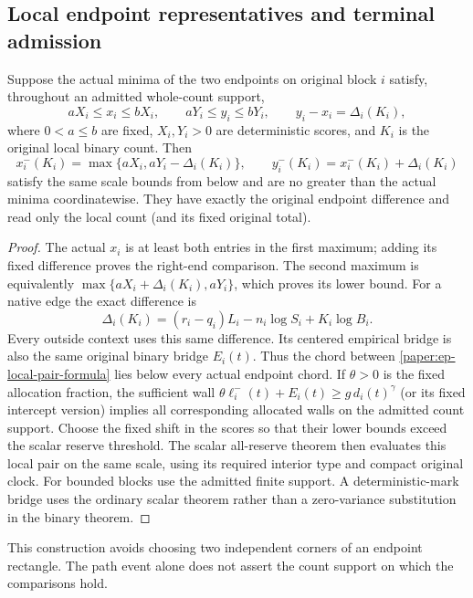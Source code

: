 \subsection{Local endpoint representatives and terminal admission}
\label{paper:ep-localization}
\begin{lemma}
\label{paper:ep-local-pair}
Suppose the actual minima of the two endpoints on original block $i$
satisfy, throughout an admitted whole-count support,
\[
 aX_i\leq x_i\leq bX_i,\qquad aY_i\leq y_i\leq bY_i,
 \qquad y_i-x_i=\Delta_i(K_i),
\]
where $0<a\leq b$ are fixed, $X_i,Y_i>0$ are deterministic scores,
and $K_i$ is the original local binary count.  Then
\begin{equation}\label{paper:ep-local-pair-formula}
 x_i^-(K_i)=\max\{aX_i,aY_i-\Delta_i(K_i)\},\qquad
 y_i^-(K_i)=x_i^-(K_i)+\Delta_i(K_i)
\end{equation}
satisfy the same scale bounds from below and are no greater than the
actual minima coordinatewise.  They have exactly the original endpoint
difference and read only the local count (and its fixed original total).
\end{lemma}
\begin{proof}
The actual $x_i$ is at least both entries in the first maximum;
adding its fixed difference proves the right-end comparison.  The
second maximum is equivalently
$\max\{aX_i+\Delta_i(K_i),aY_i\}$, which proves its lower bound.
For a native edge the exact difference is
\[
 \Delta_i(K_i)=(r_i-q_i)L_i-n_i\log S_i+K_i\log B_i.
\]
Every outside context uses this same difference.  Its centered
empirical bridge is also the same original binary bridge $E_i(t)$.
Thus the chord between \eqref{paper:ep-local-pair-formula} lies below
every actual endpoint chord.  If $\theta>0$ is the fixed allocation
fraction, the sufficient wall
$\theta\ell_i^-(t)+E_i(t)\geq g\,d_i(t)^\gamma$ (or its fixed
intercept version) implies all corresponding allocated walls on the
admitted count support.
Choose the fixed shift in the scores so that their lower bounds
exceed the scalar reserve threshold.  The scalar all-reserve theorem
then evaluates this local pair on the same scale, using its required
interior type and compact original clock.  For bounded blocks use
the admitted finite support.  A deterministic-mark bridge uses the
ordinary scalar theorem rather than a zero-variance substitution in
the binary theorem.
\end{proof}
This construction avoids choosing two independent corners of an
endpoint rectangle.  The path event alone does not assert the count
support on which the comparisons hold.

